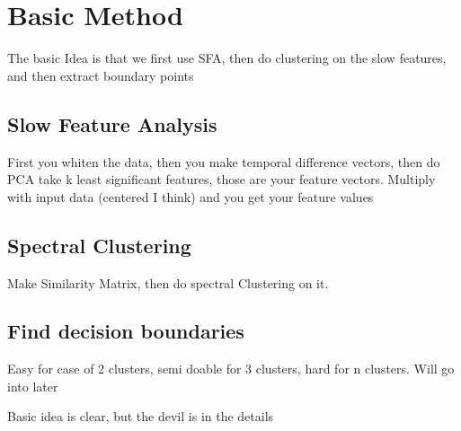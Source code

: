 \section{Basic Method}
The basic Idea is that we first use SFA, then do clustering on the slow features, and then extract boundary points
\subsection{Slow Feature Analysis}
First you whiten the data, then you make temporal difference vectors, then do PCA take k least significant features, those are your feature vectors. Multiply with input data (centered I think) and you get your feature values
\subsection{Spectral Clustering}
Make Similarity Matrix, then do spectral Clustering on it. 
\subsection{Find decision boundaries}
Easy for case of 2 clusters, semi doable for 3 clusters, hard for n clusters. Will go into later



Basic idea is clear, but the devil is in the details
